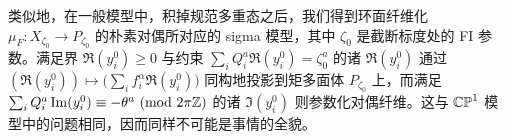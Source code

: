 类似地，在一般模型中，积掉规范多重态之后，我们得到环面纤维化 $\mu_F:X_{\zeta_0}\to P_{\zeta_0}$ 的朴素对偶所对应的 sigma 模型，其中 $\zeta_0$ 是截断标度处的 FI 参数。满足界 $\Re(y_i^0)\ge0$ 与约束 $\sum_i Q_i^a\Re(y_i^0)=\zeta_0^a$ 的诸 $\Re(y_i^0)$ 通过 $(\Re(y_i^0))\mapsto\bigl(\sum_i f_i^\alpha\Re(y_i^0)\bigr)$ 同构地投影到矩多面体 $P_{\zeta_0}$ 上，而满足 $\sum_i Q_i^a\operatorname{Im}(y_i^0)\equiv-\theta^a\ (\mathrm{mod}\ 2\pi\mathbb{Z})$ 的诸 $\Im(y_i^0)$ 则参数化对偶纤维。这与 $\mathbb{CP}^1$ 模型中的问题相同，因而同样不可能是事情的全貌。


